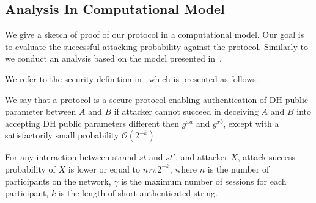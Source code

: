 \subsection{Analysis In Computational Model}\label{proof-computational-model}

We give a sketch of proof of our protocol in a computational model. Our goal is to evaluate the successful attacking probability against the protocol. Similarly to~\cite{1580514} we conduct an analysis based on the model presented in~\cite{Bellare:1994aa}. 

We refer to the security definition in~\cite{1580514} which is presented as follows. 

\begin{Definition}
We say that a protocol is a secure protocol enabling authentication of DH public parameter between $A$ and $B$ if attacker cannot succeed in deceiving $A$ and $B$ into accepting DH public parameters different then $g^{xa}$ and $g^{xb}$, except with a satisfactorily small probability $\mathcal{O}(2^{-k})$.
\end{Definition}

\begin{Lemma}\label{lemme5.1}

For any interaction between strand $st$ and $st'$, and attacker $X$, attack success probability of $X$ is lower or equal to $n.\gamma.2^{-k}$, 
where $n$ is the number of participants on the network, $\gamma$ is the maximum number of sessions for each participant, $k$ is the length of short authenticated string. 
\end{Lemma}

